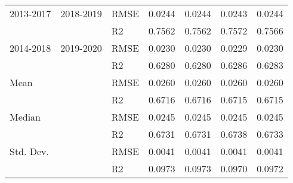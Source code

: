 \begin{tabular}{lllrrrr}
 2013-2017 &  2018-2019 &    RMSE &  0.0244 &  0.0244 &  0.0243 &       0.0244 \\
           &            &      R2 &  0.7562 &  0.7562 &  0.7572 &       0.7566 \\
 2014-2018 &  2019-2020 &    RMSE &  0.0230 &  0.0230 &  0.0229 &       0.0230 \\
           &            &      R2 &  0.6280 &  0.6280 &  0.6286 &       0.6283 \\
      Mean &            &    RMSE &  0.0260 &  0.0260 &  0.0260 &       0.0260 \\
           &            &      R2 &  0.6716 &  0.6716 &  0.6715 &       0.6715 \\
    Median &            &    RMSE &  0.0245 &  0.0245 &  0.0245 &       0.0245 \\
           &            &      R2 &  0.6731 &  0.6731 &  0.6738 &       0.6733 \\
 Std. Dev. &            &    RMSE &  0.0041 &  0.0041 &  0.0041 &       0.0041 \\
           &            &      R2 &  0.0973 &  0.0973 &  0.0970 &       0.0972 \\
\bottomrule
\end{tabular}
